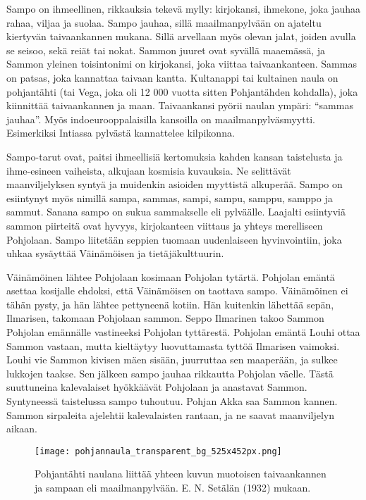   Sampo on ihmeellinen, rikkauksia tekevä mylly: kirjokansi, ihmekone, joka jauhaa rahaa, viljaa ja
  suolaa. Sampo jauhaa, sillä maailmanpylvään on ajateltu kiertyvän taivaankannen mukana. Sillä
  arvellaan myös olevan jalat, joiden avulla se seisoo, sekä reiät tai nokat. Sammon juuret ovat
  syvällä maaemässä, ja Sammon yleinen toisintonimi on kirjokansi, joka viittaa taivaankanteen.
  Sammas on patsas, joka kannattaa taivaan kantta. Kultanappi tai kultainen naula on pohjantähti
  (tai Vega, joka oli 12 000 vuotta sitten Pohjantähden kohdalla), joka kiinnittää taivaankannen
  ja maan. Taivaankansi pyörii naulan ympäri: ``sammas jauhaa''. Myös indoeurooppalaisilla kansoilla
  on maailmanpylväsmyytti. Esimerkiksi Intiassa pylvästä kannattelee kilpikonna.
  \par
  Sampo-tarut ovat, paitsi ihmeellisiä kertomuksia kahden kansan taistelusta ja ihme-esineen
  vaiheista, alkujaan kosmisia kuvauksia. Ne selittävät maanviljelyksen syntyä ja muidenkin
  asioiden myyttistä alkuperää. Sampo on esiintynyt myös nimillä sampa, sammas, sampi, sampu,
  samppu, samppo ja sammut. Sanana sampo on sukua sammakselle eli pylväälle. Laajalti esiintyviä
  sammon piirteitä ovat hyvyys, kirjokanteen viittaus ja yhteys merelliseen Pohjolaan. Sampo
  liitetään seppien tuomaan uudenlaiseen hyvinvointiin, joka uhkaa sysäyttää Väinämöisen ja
  tietäjäkulttuurin.
  \par
  Väinämöinen lähtee Pohjolaan kosimaan Pohjolan tytärtä. Pohjolan emäntä a\-settaa kosijalle
  ehdoksi, että Väinämöisen on taottava sampo. Väinämöinen ei tähän pysty, ja hän lähtee pettyneenä
  kotiin. Hän kuitenkin lähettää sepän, Ilmarisen, takomaan Pohjolaan sammon. Seppo Ilmarinen takoo
  Sammon Pohjolan emännälle vastineeksi Pohjolan tyttärestä. Pohjolan emäntä Louhi ottaa Sammon
  vastaan, mutta kieltäytyy luovuttamasta tyttöä Ilmarisen vaimoksi. Louhi vie Sammon kivisen mäen
  sisään, juurruttaa sen maaperään, ja sulkee lukkojen taakse. Sen jälkeen sampo jauhaa rikkautta
  Pohjolan väelle. Tästä suuttuneina kalevalaiset hyökkäävät Pohjolaan ja anastavat Sammon.
  Syntyneessä taistelussa sampo tuhoutuu. Pohjan Akka saa Sammon kannen. Sammon sirpaleita
  ajelehtii kalevalaisten rantaan, ja ne saavat maanviljelyn aikaan.

  \begin{figure}[!hb]%
    \centering%
    \texttt{[image: pohjannaula\_transparent\_bg\_525x452px.png]}%
    \caption{Pohjantähti naulana liittää yhteen kuvun muotoisen taivaankannen ja sampaan eli maailmanpylvään. E. N. Setälän (1932) mukaan.}%
  \end{figure}


